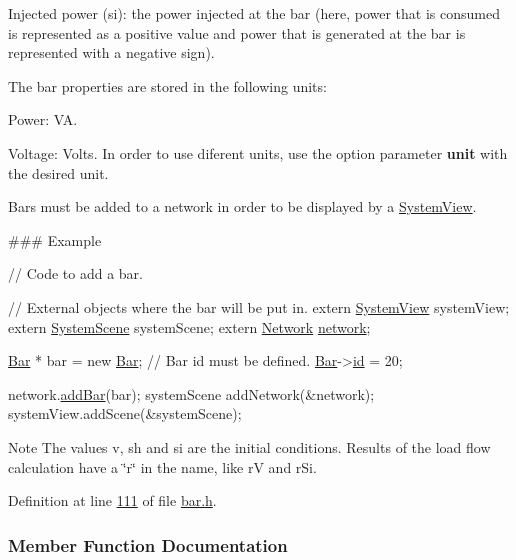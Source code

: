Injected power (si)\+: the power injected at the bar (here, power that is consumed is represented as a positive value and power that is generated at the bar is represented with a negative sign).

The bar properties are stored in the following units\+:
\begin{DoxyItemize}
\item Power\+: V\+A.
\item Voltage\+: Volts. In order to use diferent units, use the option parameter {\bfseries unit} with the desired unit.
\end{DoxyItemize}

Bars must be added to a network in order to be displayed by a \hyperlink{class_system_view}{System\+View}.

\#\#\# Example 
\begin{DoxyCode}
\textcolor{comment}{// Code to add a bar.}

\textcolor{comment}{// External objects where the bar will be put in.}
\textcolor{keyword}{extern} \hyperlink{class_system_view}{SystemView} systemView;
\textcolor{keyword}{extern} \hyperlink{class_system_scene}{SystemScene} systemScene;
\textcolor{keyword}{extern} \hyperlink{class_network}{Network} \hyperlink{class_bar_a80025f13884750add58cc61b318357ff}{network};

\hyperlink{class_bar}{Bar} * bar = \textcolor{keyword}{new} \hyperlink{group___models_ga9cae2188fcc6cce41caa7898c64548d1}{Bar};
\textcolor{comment}{// Bar id must be defined.}
\hyperlink{class_bar}{Bar}->\hyperlink{class_bar_a9dc5c6a6d44fe412ae34ef8a881b8dce}{id} = 20;

network.\hyperlink{group___graphics_ga8c5dfef0216731246f7411e1a5fbee01}{addBar}(bar);
systemScene addNetwork(&network);
systemView.addScene(&systemScene);
\end{DoxyCode}


\begin{DoxyNote}{Note}
The values v, sh and si are the initial conditions. Results of the load flow calculation have a \char`\"{}r\char`\"{} in the name, like r\+V and r\+Si. 
\end{DoxyNote}


Definition at line \hyperlink{bar_8h_source_l00111}{111} of file \hyperlink{bar_8h_source}{bar.\+h}.



\subsubsection{Member Function Documentation}
\hypertarget{class_bar_a66bcbd19582dddee7e171ae5a4475f4b}{}

